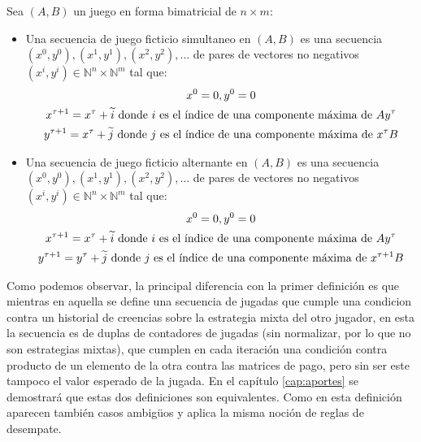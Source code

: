 \begin{definition} \label{def:fp:brandt}
    Sea $(A, B)$ un juego en forma bimatricial de $n \times m$:
    \begin{itemize}
        \item Una secuencia de juego ficticio simultaneo en $(A, B)$ es una secuencia $(x^0, y^0), (x^1, y^1), (x^2, y^2), \dots$ de pares de vectores no negativos $(x^i, y^i) \in \mathbb{N}^n \times \mathbb{N}^m$ tal que:
        \begin{gather*}
            x^0 = \boldmath{0}, y^0 = \boldmath{0} \\
            x^{\tau+1} = x^{\tau} + \widetilde{i} \text{\ donde $i$ es el índice de una componente máxima de $Ay^\tau$} \\
            y^{\tau+1} = x^{\tau} + \widetilde{j} \text{\ donde $j$ es el índice de una componente máxima de $x^{\tau}B$}
        \end{gather*}
        \item Una secuencia de juego ficticio alternante en $(A, B)$ es una secuencia $(x^0, y^0), (x^1, y^1), (x^2, y^2), \dots$ de pares de vectores no negativos $(x^i, y^i) \in \mathbb{N}^n \times \mathbb{N}^m$ tal que:
        \begin{gather*}
            x^0 = \boldmath{0}, y^0 = \boldmath{0} \\
            x^{\tau+1} = x^{\tau} + \widetilde{i} \text{\ donde $i$ es el índice de una componente máxima de $Ay^\tau$} \\
            y^{\tau+1} = y^{\tau} + \widetilde{j} \text{\ donde $j$ es el índice de una componente máxima de $x^{\tau+1}B$}
        \end{gather*}
    \end{itemize}
\end{definition}

Como podemos observar, la principal diferencia con la primer definición es que mientras en aquella se define una secuencia de jugadas que cumple una condicion contra un historial de creencias sobre la estrategia mixta del otro jugador, en esta la secuencia es de duplas de contadores de jugadas (sin normalizar, por lo que no son estrategias mixtas), que cumplen en cada iteración una condición contra producto de un elemento de la otra contra las matrices de pago, pero sin ser este tampoco el valor esperado de la jugada. En el capítulo \ref{cap:aportes} se demostrará que estas dos definiciones son equivalentes. Como en esta definición aparecen también casos ambigüos y aplica la misma noción de reglas de desempate.





